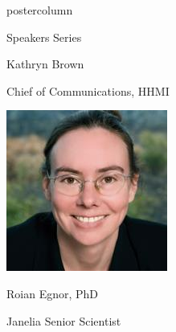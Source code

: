 \documentclass{beamer}
\begin{document}
\begin{frame}
\begin{columns}
\begin{column}{.33\textwidth}
\begin{beamercolorbox}[center,wd=\textwidth]{postercolumn}
\begin{minipage}[T]{.95\textwidth}
{\begin{myblock}{Speakers Series}
\begin{addmargin}[1em]{1em}
\begin{minipage}{0.49\linewidth}
                    \centerline{Kathryn Brown}\newline
                    \centerline{Chief of Communications, HHMI}
                \end{minipage}
            \end{addmargin}
            \vspace{1cm}
            \begin{addmargin}[1em]{1em}
                \begin{minipage}{0.49\linewidth}
                    \includegraphics[width=\linewidth]{img/roian.jpg}
                    \centerline{Roian Egnor, PhD}\newline
                    \centerline{Janelia Senior Scientist}
                \end{minipage}
                \begin{minipage}{0.49\linewidth}

\end{minipage}
\end{addmargin}
\end{myblock}}
\end{minipage}
\end{beamercolorbox}
\end{column}
\end{columns}
\end{frame}
\end{document}
